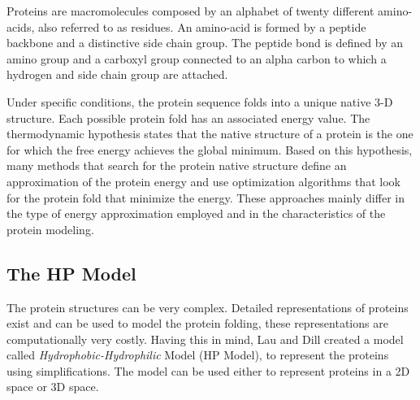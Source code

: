 \documentclass[conference]{IEEEtran}
\begin{document}
Proteins are macromolecules composed by an alphabet of twenty different amino-acids, also referred to as residues. An amino-acid is formed by a peptide backbone and a distinctive side chain group. The peptide bond is defined by an amino group and a carboxyl group connected to an alpha carbon to which a hydrogen and side chain group are attached.




Under specific conditions, the protein sequence folds into a unique native 3-D structure. Each possible protein fold has an associated energy value. The thermodynamic hypothesis states that the native structure of a protein is the one for which the free energy achieves the global minimum. Based on this hypothesis, many methods \cite{custodio2004investigation, hsu2003growth, krasnogor2002multimeme, lin2011protein, unger1993genetic} that search for the protein native structure define an approximation of the protein energy and use optimization algorithms that look for the protein fold that minimize the energy. These approaches mainly differ in the type of energy approximation employed and in the characteristics of the protein modeling.


\subsection{The HP Model} \label{sec:hpModel}


The protein structures can be very complex. Detailed representations of proteins exist	 and can be used to model the protein folding, these representations are computationally very costly. Having this in mind, Lau and Dill \cite{lau1989lattice} created a model called \textit{Hydrophobic-Hydrophilic} Model (HP Model), to represent the proteins using simplifications. The model can be used either to represent proteins in a 2D space or 3D space.
\end{document}
